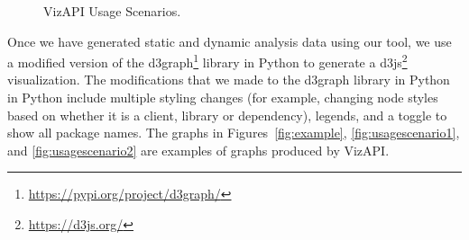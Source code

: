 \begin{figure}[h]
\begin{center}

\hspace{7mm}

\caption{\label{fig:usagescenarios} VizAPI Usage Scenarios.}

\end{center}
\end{figure}


Once we have generated static and dynamic analysis data using our tool, we use a modified version
of the d3graph\footnote{\url{https://pypi.org/project/d3graph/}} library in Python to generate a d3js\footnote{\url{https://d3js.org/}}
visualization. The modifications that we made to the d3graph  library in Python in Python include multiple styling changes (for example, changing node styles based on whether it is a client, library or dependency),
legends, and a toggle to show all package names. 
The graphs in Figures~\ref{fig:example}, \ref{fig:usagescenario1}, and \ref{fig:usagescenario2} are examples of graphs produced by VizAPI.

